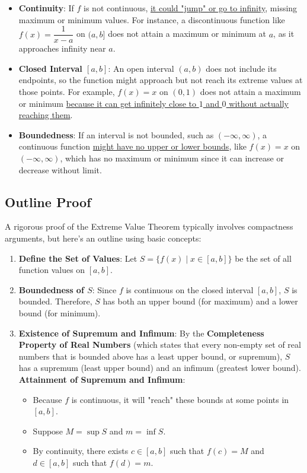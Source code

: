 \documentclass[a4paper,12pt]{book}
\begin{document}
\begin{itemize}
	\item 
	\textbf{Continuity}: If \( f \) is not continuous, \uline{it could "jump" or go to infinity}, missing maximum or minimum values. For instance, a discontinuous function like \( f(x) = \dfrac{1}{x - a} \) on \((a, b]\) does not attain a maximum or minimum at \( a \), as it approaches infinity near \( a \).
	\item 
	\textbf{Closed Interval \([a, b]\)}: An open interval \((a, b)\) does not include its endpoints, so the function might approach but not reach its extreme values at those points. For example, \( f(x) = x \) on \((0, 1)\) does not attain a maximum or minimum \uline{because it can get infinitely close to \( 1 \) and \( 0 \) without actually reaching them}.
	\item
	\textbf{Boundedness}: If an interval is not bounded, such as \((-\infty, \infty)\), a continuous function \uline{might have no upper or lower bounds}, like \( f(x) = x \) on \((-\infty, \infty)\), which has no maximum or minimum since it can increase or decrease without limit.
\end{itemize}

\subsection{Outline Proof}

A rigorous proof of the Extreme Value Theorem typically involves compactness arguments, but here’s an outline using basic concepts:

\begin{enumerate}
	\item 
	\textbf{Define the Set of Values}: Let \( S = \{ f(x) \mid x \in [a, b] \} \) be the set of all function values on \([a, b]\).
	\item 
	\textbf{Boundedness of \( S \)}: Since \( f \) is continuous on the closed interval \([a, b]\), \( S \) is bounded. Therefore, \( S \) has both an upper bound (for maximum) and a lower bound (for minimum).
	\item 
	\textbf{Existence of Supremum and Infimum}: By the \textbf{Completeness Property of Real Numbers} (which states that every non-empty set of real numbers that is bounded above has a least upper bound, or supremum), \( S \) has a supremum (least upper bound) and an infimum (greatest lower bound).
	\textbf{Attainment of Supremum and Infimum}:
	\begin{itemize}
		\item 
		Because \( f \) is continuous, it will "reach" these bounds at some points in \([a, b]\).
		\item 
		Suppose \( M = \sup S \) and \( m = \inf S \).
		\item 
		By continuity, there exists \( c \in [a, b] \) such that \( f(c) = M \) and \( d \in [a, b] \) such that \( f(d) = m \).
	\end{itemize}
\end{enumerate}
\end{document}
